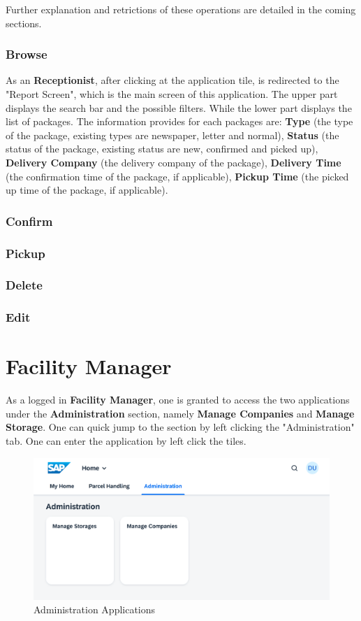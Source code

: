 Further explanation and retrictions of these operations are detailed in the coming sections.


\subsubsection{Browse}
As an \textbf{Receptionist}, after clicking at the application tile, is redirected to the "Report Screen", which is the main screen of this application. The upper part displays the search bar and the possible filters. While the lower part displays the list of packages. The information provides for each packages are: \textbf{Type} (the type of the package, existing types are newspaper, letter and normal), \textbf{Status} (the status of the package, existing status are new, confirmed and picked up), \textbf{Delivery Company} (the delivery company of the package), \textbf{Delivery Time} (the confirmation time of the package, if applicable), \textbf{Pickup Time} (the picked up time of the package, if applicable).

\subsubsection{Confirm}
\subsubsection{Pickup}
\subsubsection{Delete}
\subsubsection{Edit}
\pagebreak

\section{Facility Manager}

As a logged in \textbf{Facility Manager}, one is granted to access the two applications under the \textbf{Administration} section, namely \textbf{Manage Companies} and \textbf{Manage Storage}. One can quick jump to the section by left clicking the "Administration" tab. One can enter the application by left click the tiles.

\begin{figure}[H]
	\centering
	\includegraphics[width=1\linewidth]{images/user_doc/overviews/AdminTab.png}
	\caption{Administration Applications}
	\label{fig:AdministrationApplications}
\end{figure}



